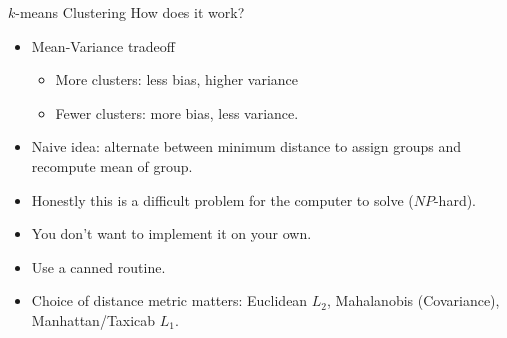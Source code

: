 \documentclass[xcolor=pdftex,dvipsnames,table,mathserif,aspectratio=169]{beamer}
\begin{document}
\begin{frame}{$k$-means Clustering}
How does it work?
\begin{itemize}
\item Mean-Variance tradeoff
\begin{itemize}
\item More clusters: less bias, higher variance
\item Fewer clusters: more bias, less variance.
\end{itemize}
\item Naive idea: alternate between minimum distance to assign groups and recompute mean of group.
\item Honestly this is a difficult problem for the computer to solve ($NP$-hard).
\item You don't want to implement it on your own.
\item Use a canned routine.
  \item Choice of distance metric matters: Euclidean $L_2$, Mahalanobis (Covariance), Manhattan/Taxicab $L_1$.
\end{itemize}
\end{frame}
\end{document}
